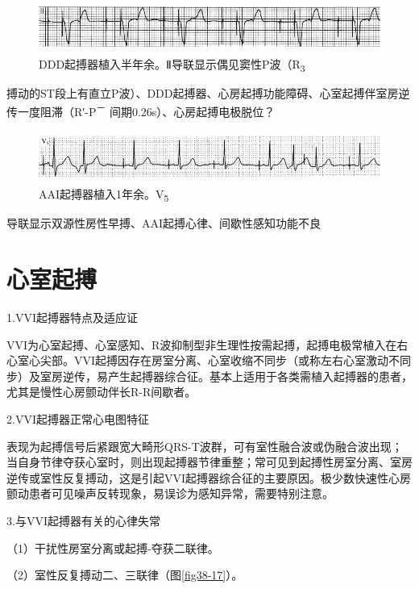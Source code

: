 \begin{figure}[!htbp]
 \centering
 \includegraphics[width=5.58333in,height=0.66667in]{./images/Image00618.jpg}
 \captionsetup{justification=centering}
 \caption{DDD起搏器植入半年余。Ⅱ导联显示偶见窦性P波（R\textsubscript{3}}
 \label{fig38-15}
  \end{figure} 
搏动的ST段上有直立P波）、DDD起搏器、心房起搏功能障碍、心室起搏伴室房逆传一度阻滞（R′-P\textsuperscript{－}
间期0.26s）、心房起搏电极脱位？

\begin{figure}[!htbp]
 \centering
 \includegraphics[width=5.58333in,height=0.66667in]{./images/Image00619.jpg}
 \captionsetup{justification=centering}
 \caption{AAI起搏器植入1年余。V\textsubscript{5}}
 \label{fig38-16}
  \end{figure} 
导联显示双源性房性早搏、AAI起搏心律、间歇性感知功能不良

\protect\hypertarget{text00045.htmlux5cux23subid492}{}{}

\section{心室起搏}

1.VVI起搏器特点及适应证

VVI为心室起搏、心室感知、R波抑制型非生理性按需起搏，起搏电极常植入在右心室心尖部。VVI起搏因存在房室分离、心室收缩不同步（或称左右心室激动不同步）及室房逆传，易产生起搏器综合征。基本上适用于各类需植入起搏器的患者，尤其是慢性心房颤动伴长R-R间歇者。

2.VVI起搏器正常心电图特征

表现为起搏信号后紧跟宽大畸形QRS-T波群，可有室性融合波或伪融合波出现；当自身节律夺获心室时，则出现起搏器节律重整；常可见到起搏性房室分离、室房逆传或室性反复搏动，这是引起VVI起搏器综合征的主要原因。极少数快速性心房颤动患者可见噪声反转现象，易误诊为感知异常，需要特别注意。

3.与VVI起搏器有关的心律失常

（1）干扰性房室分离或起搏-夺获二联律。

（2）室性反复搏动二、三联律（图\ref{fig38-17}）。

